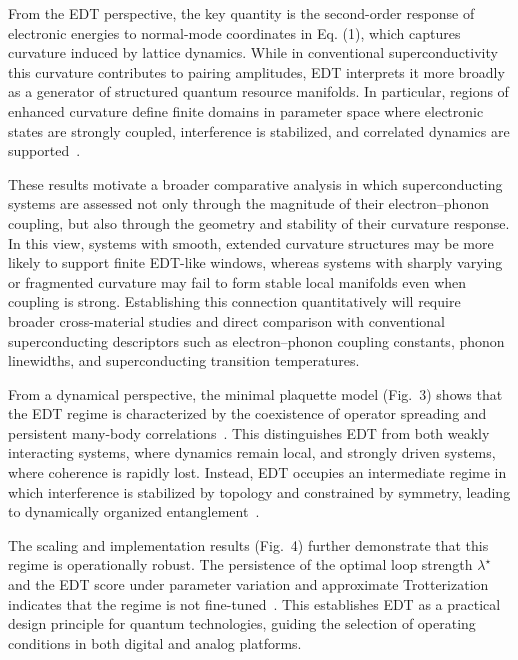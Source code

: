 \documentclass[twocolumn,10pt]{article}
\begin{document}
From the EDT perspective, the key quantity is the second-order response of electronic energies to normal-mode coordinates in Eq. (1), which captures curvature induced by lattice dynamics. While in conventional superconductivity this curvature contributes to pairing amplitudes, EDT interprets it more broadly as a generator of structured quantum resource manifolds. In particular, regions of enhanced curvature define finite domains in parameter space where electronic states are strongly coupled, interference is stabilized, and correlated dynamics are supported~\cite{Giustino2017}.

These results motivate a broader comparative analysis in which superconducting systems are assessed not only through the magnitude of their electron--phonon coupling, but also through the geometry and stability of their curvature response. In this view, systems with smooth, extended curvature structures may be more likely to support finite EDT-like windows, whereas systems with sharply varying or fragmented curvature may fail to form stable local manifolds even when coupling is strong. Establishing this connection quantitatively will require broader cross-material studies and direct comparison with conventional superconducting descriptors such as electron--phonon coupling constants, phonon linewidths, and superconducting transition temperatures.

From a dynamical perspective, the minimal plaquette model (Fig.~3) shows that the EDT regime is characterized by the coexistence of operator spreading and persistent many-body correlations~\cite{Choi2016,KimHuse2013}. This distinguishes EDT from both weakly interacting systems, where dynamics remain local, and strongly driven systems, where coherence is rapidly lost. Instead, EDT occupies an intermediate regime in which interference is stabilized by topology and constrained by symmetry, leading to dynamically organized entanglement~\cite{Swingle2018}.

The scaling and implementation results (Fig.~4) further demonstrate that this regime is operationally robust. The persistence of the optimal loop strength $\lambda^\star$ and the EDT score under parameter variation and approximate Trotterization indicates that the regime is not fine-tuned~\cite{Lloyd1996,Childs2019}. This establishes EDT as a practical design principle for quantum technologies, guiding the selection of operating conditions in both digital and analog platforms.
\end{document}
